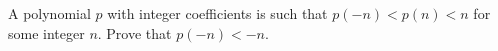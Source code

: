 A polynomial $p$ with integer coefficients is such that $p(-n) < p(n) < n$ for some integer $n$. Prove that $p(-n) < -n$.